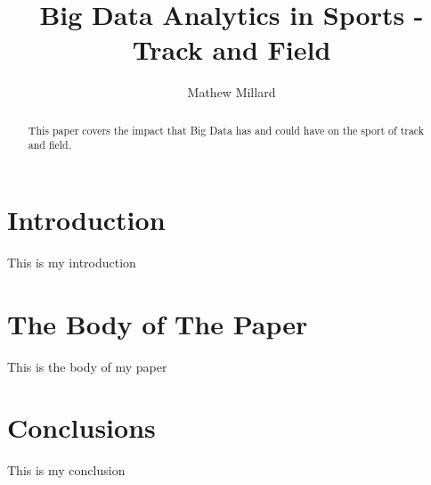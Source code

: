 \documentclass[sigconf]{acmart}
\begin{document}
\title{Big Data Analytics in Sports - Track and Field}


\author{Mathew Millard}

\renewcommand{\shortauthors}{M. Millard}

\begin{abstract}
This paper covers the impact that Big Data has and could have on the sport of track and field.
\end{abstract}



\maketitle

\section{Introduction}
This is my introduction

\section{The Body of The Paper}
This is the body of my paper

\section{Conclusions}
This is my conclusion



 
\end{document}
